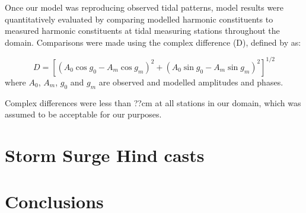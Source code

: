 \documentclass[pdftex,10pt]{article}
\begin{document}

Once our model was reproducing observed tidal patterns, model results were quantitatively evaluated by comparing modelled harmonic constituents to measured harmonic constituents at tidal measuring stations throughout the domain. Comparisons were made using the complex difference (D), defined by \citep{foreman1995tidal} as:

\begin{equation}
D = [(A_0 \cos g_0 - A_m \cos g_m)^2 + (A_0 \sin g_0 - A_m \sin g_m)^2]^{1/2}
\end{equation}
where $A_0$, $A_m$, $g_0$ and $g_m$ are observed and modelled amplitudes and phases.


Complex differences were less than ??cm at all stations in our domain, which was assumed to be acceptable for our purposes. 

\section{Storm Surge Hind casts}\label{sec:storm}

\section{Conclusions}\label{sec:conclusions}




\end{document}
